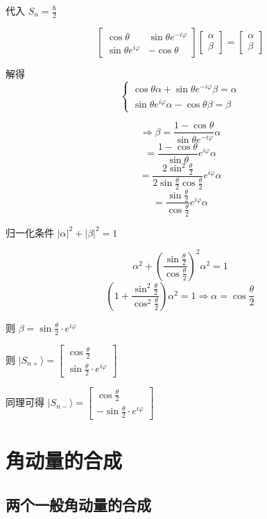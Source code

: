 \documentclass[lang=cn,10pt]{elegantbook}
\begin{document}
代入 $S_n = \frac{\hbar}{2}$

\[
\begin{bmatrix} \cos\theta & \sin\theta e^{-i\varphi} \\ \sin\theta e^{i\varphi} & -\cos\theta \end{bmatrix} \begin{bmatrix} \alpha \\ \beta \end{bmatrix} = \begin{bmatrix} \alpha \\ \beta \end{bmatrix}
\]

解得
\[
\begin{cases}
	\cos\theta \alpha + \sin\theta e^{-i\varphi} \beta = \alpha \\
	\sin\theta e^{i\varphi} \alpha - \cos\theta \beta = \beta
\end{cases}
\]

\[
\Rightarrow \beta = \frac{1 - \cos\theta}{\sin\theta e^{-i\varphi}} \alpha
\]
\[
= \frac{1 - \cos\theta}{\sin\theta} e^{i\varphi} \alpha
\]
\[
= \frac{2 \sin^2 \frac{\theta}{2}}{2 \sin \frac{\theta}{2} \cos \frac{\theta}{2}} e^{i\varphi} \alpha
\]
\[
= \frac{\sin \frac{\theta}{2}}{\cos \frac{\theta}{2}} e^{i\varphi} \alpha
\]

归一化条件 $|\alpha|^2 + |\beta|^2 = 1$

\[
\alpha^2 + \left(\frac{\sin \frac{\theta}{2}}{\cos \frac{\theta}{2}}\right)^2 \alpha^2 = 1
\]
\[
\left(1 + \frac{\sin^2 \frac{\theta}{2}}{\cos^2 \frac{\theta}{2}}\right) \alpha^2 = 1 \Rightarrow \alpha = \cos \frac{\theta}{2}
\]

则 $\beta = \sin \frac{\theta}{2} \cdot e^{i\varphi}$

则 $|S_{n+}\rangle = \begin{bmatrix} \cos \frac{\theta}{2} \\ \sin \frac{\theta}{2} \cdot e^{i\varphi} \end{bmatrix}$

同理可得 $|S_{n-}\rangle = \begin{bmatrix} \cos \frac{\theta}{2} \\ -\sin \frac{\theta}{2} \cdot e^{i\varphi} \end{bmatrix}$
\section{角动量的合成}
\subsection{两个一般角动量的合成}
\end{document}
